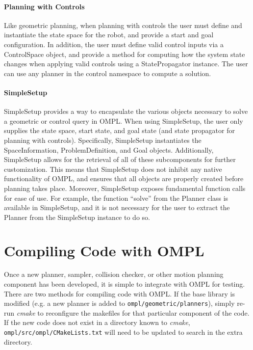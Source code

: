\paragraph {Planning with Controls}
Like geometric planning, when planning with controls the user must define and
instantiate the state space for the robot, and provide a start and goal
configuration.  In addition, the user must define valid control inputs via
a ControlSpace object, and provide a method for computing how the system state
changes when applying valid controls using a StatePropagator instance.  The
user can use any planner in the control namespace to compute a solution.

\paragraph {SimpleSetup}
SimpleSetup provides a way to encapsulate the various objects necessary to
solve a geometric or control query in OMPL.  When using SimpleSetup, the user
only supplies the state space, start state, and goal state (and state propagator
for planning with controls). Specifically, SimpleSetup instantiates the
SpaceInformation, ProblemDefinition, and Goal objects.  Additionally,
SimpleSetup allows for the retrieval of all of these subcomponents for further
customization.  This means that SimpleSetup does not inhibit any native
functionality of OMPL, and ensures that all objects are properly created before
planning takes place.  Moreover, SimpleSetup exposes fundamental function
calls for ease of use.  For example, the function ``solve'' from the Planner
class is available in SimpleSetup, and it is not necessary for the user to
extract the Planner from the SimpleSetup instance to do so.

\section {Compiling Code with OMPL}
Once a new planner, sampler, collision checker, or other motion planning
component has been developed, it is simple to integrate with OMPL for testing.
There are two methods for compiling code with OMPL.  If the base library is
modified (e.g. a new planner is added to  {\tt ompl/geometric/planners}),
simply re-run \emph{cmake} to reconfigure the makefiles for that particular
component of the code.  If the new code does not exist in a directory known to
\emph{cmake}, {\tt ompl/src/ompl/CMakeLists.txt} will need to be updated to
search in the extra directory.

